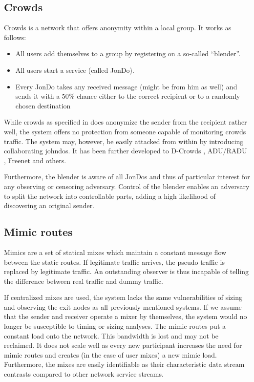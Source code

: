 \subsection{Crowds}

Crowds is a network that offers anonymity within a local group. It works as follows:

\begin{itemize}
	\item All users add themselves to a group by registering on a so-called ``blender''.
	\item All users start a service (called JonDo).
	\item Every JonDo takes any received message (might be from him as well) and sends it with a 50\% chance either to the correct recipient or to a randomly chosen destination
\end{itemize}

While crowds as specified in \cite{crowds:tissec} does anonymize the sender from the recipient rather well, the system offers no protection from someone capable of monitoring crowds traffic. The system may, however, be easily attacked from within by introducing collaborating johndos. It has been further developed to D-Crowds \cite{DBLP:conf/esorics/DanezisDKT09}, ADU/RADU \cite{Munoz-Gea2008}, Freenet\cite{freenet} and others. 

Furthermore, the blender is aware of all JonDos and thus of particular interest for any observing or censoring adversary. Control of the blender enables an adversary to split the network into controllable parts, adding a high likelihood of discovering an original sender.

\subsection{Mimic routes}
Mimics are a set of statical mixes which maintain a constant message flow between the static routes. If legitimate traffic arrives, the pseudo traffic is replaced by legitimate traffic. An outstanding observer is thus incapable of telling the difference between real traffic and dummy traffic.

If centralized mixes are used, the system lacks the same vulnerabilities of sizing and observing the exit nodes as all previously mentioned systems. If we assume that the sender and receiver operate a mixer by themselves, the system would no longer be susceptible to timing or sizing analyses. The mimic routes put a constant load onto the network. This bandwidth is lost and may not be reclaimed. It does not scale well as every new participant increases the need for mimic routes and creates (in the case of user mixes) a new mimic load. Furthermore, the mixes are easily identifiable as their characteristic data stream contrasts compared to other network service streams.

